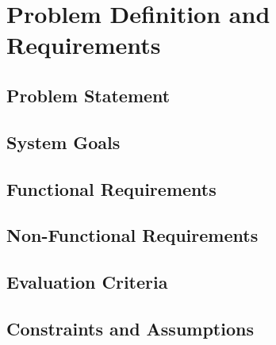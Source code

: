 \chapter{Problem Definition and Requirements}
\label{chap:problem}

\section{Problem Statement}
\label{sec:prob-statement}


\section{System Goals}
\label{sec:prob-goals}


\section{Functional Requirements}
\label{sec:prob-functional}


\section{Non-Functional Requirements}
\label{sec:prob-nonfunctional}


\section{Evaluation Criteria}
\label{sec:prob-evaluation-criteria}


\section{Constraints and Assumptions}
\label{sec:prob-constraints}


